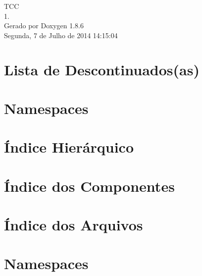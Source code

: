 \documentclass[twoside]{book}
\newcommand{\clearemptydoublepage}{%
  \newpage{\pagestyle{empty}\cleardoublepage}%
}
\begin{document}
\hypersetup{pageanchor=false}
\begin{titlepage}
\vspace*{7cm}
\begin{center}%
{\Large T\-C\-C \\[1ex]\large 1. }\\
\vspace*{1cm}
{\large Gerado por Doxygen 1.8.6}\\
\vspace*{0.5cm}
{\small Segunda, 7 de Julho de 2014 14:15:04}\\
\end{center}
\end{titlepage}
\clearemptydoublepage
\tableofcontents
\clearemptydoublepage
{}
\hypersetup{pageanchor=true}

\chapter{Lista de Descontinuados(as)}
\label{deprecated}
\hypertarget{deprecated}{}

\chapter{Namespaces}

\chapter{Índice Hierárquico}

\chapter{Índice dos Componentes}

\chapter{Índice dos Arquivos}

\chapter{Namespaces}







\end{document}

